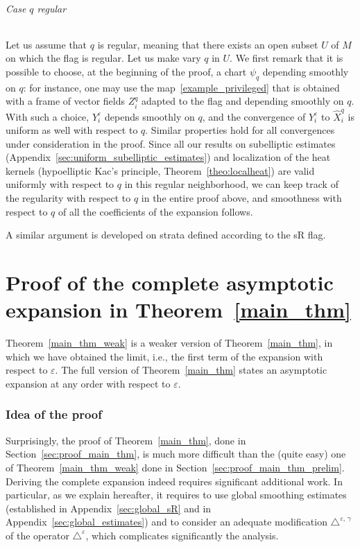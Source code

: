 \documentclass[10pt]{amsart}
\theoremstyle{definition}\newtheorem{defi}[theo]{Definition}\newtheorem{rema}[theo]{Remark}\newtheorem{exam}[theo]{Example}\newtheorem{exem}[theo]{Example}\newtheorem{nota}[theo]{Notation}
\begin{document}
\paragraph{Case $q$ regular}
Let us assume that $q$ is regular, meaning that there exists an open subset $U$ of $M$ on which the flag is regular. Let us make vary $q$ in $U$. We first remark that it is possible to choose, at the beginning of the proof, a chart $\psi_{q}$ depending smoothly on $q$: for instance, one may use the map~\eqref{example_privileged} that is obtained with a frame of vector fields $Z_i^{q}$ adapted to the flag and depending smoothly on $q$. With such a choice, $Y_i^\varepsilon$ depends smoothly on $q$, and the convergence of $Y_i^\varepsilon$ to $\widehat{X}_i^{q}$ is uniform as well with respect to $q$. Similar properties hold for all convergences under consideration in the proof. Since all our results on subelliptic estimates (Appendix~\ref{sec:uniform_subelliptic_estimates}) and localization of the heat kernels (hypoelliptic Kac's principle, Theorem~\ref{theo:localheat}) are valid uniformly with respect to $q$ in this regular neighborhood, we can keep track of the regularity with respect to $q$ in the entire proof above, and smoothness with respect to $q$ of all the coefficients of the expansion follows.

A similar argument is developed on strata defined according to the sR flag.

\vspace{10em}
\pagebreak

{\Large
\part{Proof of the complete asymptotic expansion in Theorem~\ref{main_thm}}\label{part_complete}
}


Theorem~\ref{main_thm_weak} is a weaker version of Theorem~\ref{main_thm}, in which we have obtained the limit, i.e., the first term of the expansion with respect to $\varepsilon$. The full version of Theorem~\ref{main_thm} states an asymptotic expansion at any order with respect to $\varepsilon$.

\goodbreak
\section{Idea of the proof}\label{sec_ideaoftheproof}
Surprisingly, the proof of Theorem~\ref{main_thm}, done in Section~\ref{sec:proof_main_thm}, is much more difficult than the (quite easy) one of Theorem~\ref{main_thm_weak} done in Section~\ref{sec:proof_main_thm_prelim}. Deriving the complete expansion indeed requires significant additional work. In particular, as we explain hereafter, it requires to use global smoothing estimates (established in Appendix~\ref{sec:global_sR} and in Appendix~\ref{sec:global_estimates}) and to consider an adequate modification $\triangle^{\varepsilon,\,\gamma}$ of the operator $\triangle^\varepsilon$, which complicates significantly the analysis.
\end{document}

